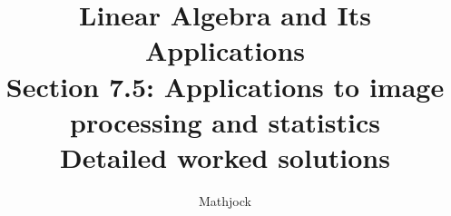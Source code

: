 
\title{\textbf{Linear Algebra and Its Applications}\\[0.3em]Section 7.5: Applications to image processing and statistics\\[0.3em]\large Detailed worked solutions}
\author{Mathjock}
\date{}

\maketitle
\bookinfo
\tableofcontents
\clearpage
\renewcommand{\thesection}{7.\arabic{section}}
\renewcommand{\theHsection}{7.\arabic{section}}
\setcounter{section}{4}


